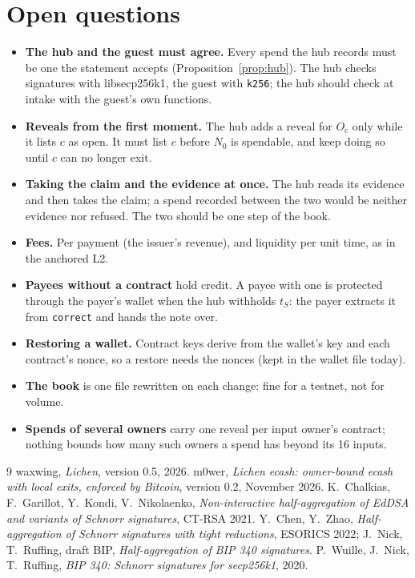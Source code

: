 \documentclass[11pt]{article}
\theoremstyle{plain}
\theoremstyle{definition}
\newcommand{\tx}[1]{\texttt{#1}}
\newcommand{\Oc}{O_c}
\begin{document}
\section{Open questions}\label{sec:open}

\begin{itemize}[nosep]
\item \textbf{The hub and the guest must agree.} Every spend the hub
  records must be one the statement accepts (Proposition~\ref{prop:hub}).
  The hub checks signatures with libsecp256k1, the guest with
  \tx{k256}; the hub should check at intake with the guest's own
  functions.
\item \textbf{Reveals from the first moment.} The hub adds a reveal for
  $\Oc$ only while it lists $c$ as open. It must list $c$ before $N_0$
  is spendable, and keep doing so until $c$ can no longer exit.
\item \textbf{Taking the claim and the evidence at once.} The hub reads
  its evidence and then takes the claim; a spend recorded between the
  two would be neither evidence nor refused. The two should be one step
  of the book.
\item \textbf{Fees.} Per payment (the issuer's revenue), and liquidity
  per unit time, as in the anchored L2.
\item \textbf{Payees without a contract} hold credit. A payee with one
  is protected through the payer's wallet when the hub withholds $t_S$:
  the payer extracts it from \tx{correct} and hands the note over.
\item \textbf{Restoring a wallet.} Contract keys derive from the wallet's
  key and each contract's nonce, so a restore needs the nonces (kept in
  the wallet file today).
\item \textbf{The book} is one file rewritten on each change: fine for a
  testnet, not for volume.
\item \textbf{Spends of several owners} carry one reveal per input
  owner's contract; nothing bounds how many such owners a spend has
  beyond its 16 inputs.
\end{itemize}

\begin{thebibliography}{9}
 waxwing, \emph{Lichen}, version 0.5, 2026.
 m0wer, \emph{Lichen ecash: owner-bound ecash with local
  exits, enforced by Bitcoin}, version 0.2, November 2026.
 K.~Chalkias, F.~Garillot, Y.~Kondi, V.~Nikolaenko,
  \emph{Non-interactive half-aggregation of EdDSA and variants of Schnorr
  signatures}, CT-RSA 2021.
 Y.~Chen, Y.~Zhao, \emph{Half-aggregation of Schnorr
  signatures with tight reductions}, ESORICS 2022; J.~Nick, T.~Ruffing,
  draft BIP, \emph{Half-aggregation of BIP 340 signatures}.
 P.~Wuille, J.~Nick, T.~Ruffing, \emph{BIP 340: Schnorr
  signatures for secp256k1}, 2020.
\end{thebibliography}
\end{document}
